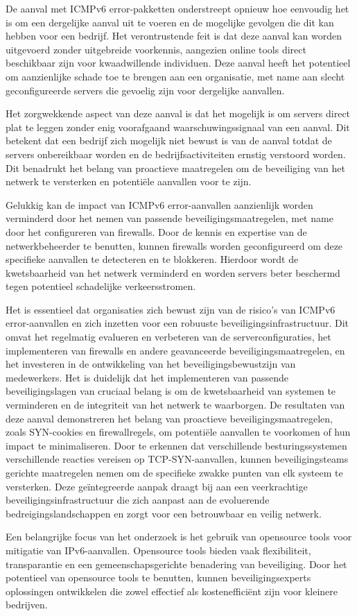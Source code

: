 De aanval met ICMPv6 error-pakketten onderstreept opnieuw hoe eenvoudig het is om een dergelijke aanval uit te voeren en de mogelijke gevolgen die dit kan hebben voor een bedrijf. Het verontrustende feit is dat deze aanval kan worden uitgevoerd zonder uitgebreide voorkennis, aangezien online tools direct beschikbaar zijn voor kwaadwillende individuen. Deze aanval heeft het potentieel om aanzienlijke schade toe te brengen aan een organisatie, met name aan slecht geconfigureerde servers die gevoelig zijn voor dergelijke aanvallen.

Het zorgwekkende aspect van deze aanval is dat het mogelijk is om servers direct plat te leggen zonder enig voorafgaand waarschuwingssignaal van een aanval. Dit betekent dat een bedrijf zich mogelijk niet bewust is van de aanval totdat de servers onbereikbaar worden en de bedrijfsactiviteiten ernstig verstoord worden. Dit benadrukt het belang van proactieve maatregelen om de beveiliging van het netwerk te versterken en potentiële aanvallen voor te zijn.
\newline

Gelukkig kan de impact van ICMPv6 error-aanvallen aanzienlijk worden verminderd door het nemen van passende beveiligingsmaatregelen, met name door het configureren van firewalls. Door de kennis en expertise van de netwerkbeheerder te benutten, kunnen firewalls worden geconfigureerd om deze specifieke aanvallen te detecteren en te blokkeren. Hierdoor wordt de kwetsbaarheid van het netwerk verminderd en worden servers beter beschermd tegen potentieel schadelijke verkeersstromen.
\newline

Het is essentieel dat organisaties zich bewust zijn van de risico's van ICMPv6 error-aanvallen en zich inzetten voor een robuuste beveiligingsinfrastructuur. Dit omvat het regelmatig evalueren en verbeteren van de serverconfiguraties, het implementeren van firewalls en andere geavanceerde beveiligingsmaatregelen, en het investeren in de ontwikkeling van het beveiligingsbewustzijn van medewerkers.
Het is duidelijk dat het implementeren van passende beveiligingslagen van cruciaal belang is om de kwetsbaarheid van systemen te verminderen en de integriteit van het netwerk te waarborgen. De resultaten van deze aanval demonstreren het belang van proactieve beveiligingsmaatregelen, zoals SYN-cookies en firewallregels, om potentiële aanvallen te voorkomen of hun impact te minimaliseren. Door te erkennen dat verschillende besturingssystemen verschillende reacties vereisen op TCP-SYN-aanvallen, kunnen beveiligingsteams gerichte maatregelen nemen om de specifieke zwakke punten van elk systeem te versterken. Deze geïntegreerde aanpak draagt bij aan een veerkrachtige beveiligingsinfrastructuur die zich aanpast aan de evoluerende bedreigingslandschappen en zorgt voor een betrouwbaar en veilig netwerk.
\newline

Een belangrijke focus van het onderzoek is het gebruik van opensource tools voor mitigatie van IPv6-aanvallen. Opensource tools bieden vaak flexibiliteit, transparantie en een gemeenschapsgerichte benadering van beveiliging. Door het potentieel van opensource tools te benutten, kunnen beveiligingsexperts oplossingen ontwikkelen die zowel effectief als kostenefficiënt zijn voor kleinere bedrijven.